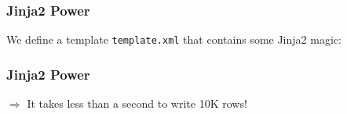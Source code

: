 \documentclass[ngerman]{beamer}
\begin{document}
\begin{frame}[fragile]
\frametitle{Jinja2 Power}

We define a template \texttt{template.xml} that contains some Jinja2 magic:



\end{frame}

\begin{frame}[fragile]
\frametitle{Jinja2 Power}



$\Rightarrow$ It takes less than a second to write 10K rows!

\end{frame}
\end{document}

